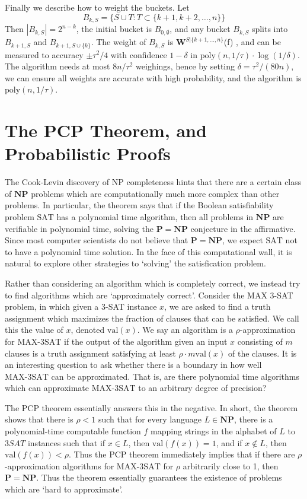 Finally we describe how to weight the buckets. Let
%
\[ B_{k,S} = \{ S \cup T : T \subset \{ k + 1, k + 2, \dots, n \} \} \]
%
Then $|B_{k,S}| = 2^{n-k}$, the initial bucket is $B_{0,\emptyset}$, and any bucket $B_{k,S}$ splits into $B_{k+1,S}$ and $B_{k+1, S \cup \{ k \}}$. The weight of $B_{k,S}$ is $\mathbf{W}^{S|\{ k+1, \dots, n \}}$(f)
, and can be measured to accuracy $\pm \tau^2/4$ with confidence $1-\delta$ in $\text{poly}(n,1/\tau) \cdot \log(1/\delta)$. The algorithm needs at most $8n/\tau^2$ weighings, hence by setting $\delta = \tau^2/(80n)$, we can ensure all weights are accurate with high probability, and the algorithm is $\text{poly}(n,1/\tau)$.

\chapter{The PCP Theorem, and Probabilistic Proofs}

The Cook-Levin discovery of NP completeness hints that there are a certain class of $\mathbf{NP}$ problems which are computationally much more complex than other problems. In particular, the theorem says that if the Boolean satisfiability problem $\text{SAT}$ has a polynomial time algorithm, then all problems in $\mathbf{NP}$ are verifiable in polynomial time, solving the $\mathbf{P} = \mathbf{NP}$ conjecture in the affirmative. Since most computer scientists do not believe that $\mathbf{P} = \mathbf{NP}$, we expect $\text{SAT}$ not to have a polynomial time solution. In the face of this computational wall, it is natural to explore other strategies to `solving' the satisfication problem.

Rather than considering an algorithm which is completely correct, we instead try to find algorithms which are `approximately correct'. Consider the MAX 3-SAT problem, in which given a 3-SAT instance $x$, we are asked to find a truth assignment which maximizes the fraction of clauses that can be satisfied. We call this the value of $x$, denoted $\text{val}(x)$. We say an algorithm is a $\rho$-approximation for $\text{MAX-3SAT}$ if the output of the algorithm given an input $x$ consisting of $m$ clauses is a truth assignment satisfying at least $\rho \cdot m \text{val}(x)$ of the clauses. It is an interesting question to ask whether there is a boundary in how well $\text{MAX-3SAT}$ can be approximated. That is, are there polynomial time algorithms which can approximate $\text{MAX-3SAT}$ to an arbitrary degree of precision?

The PCP theorem essentially answers this in the negative. In short, the theorem shows that there is $\rho < 1$ such that for every language $L \in \mathbf{NP}$, there is a polynomial-time computable function $f$ mapping strings in the alphabet of $L$ to $3SAT$ instances such that if $x \in L$, then $\text{val}(f(x)) = 1$, and if $x \not \in L$, then $\text{val}(f(x)) < \rho$. Thus the PCP theorem immediately implies that if there are $\rho$-approximation algorithms for $\text{MAX-3SAT}$ for $\rho$ arbitrarily close to 1, then $\mathbf{P} = \mathbf{NP}$. Thus the theorem essentially guarantees the existence of problems which are `hard to approximate'.


